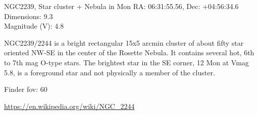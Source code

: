 \begin{block}{NGC2239, Star cluster + Nebula in Mon}
    RA: 06:31:55.56, Dec: +04:56:34.6 \\ 
    Dimensions: 9.3 \\ 
    Magnitude (V): 4.8

    NGC2239/2244 is a bright rectangular 15x5 arcmin cluster of about fifty
    star oriented NW-SE in the center of the Rosette Nebula. It contains
    several hot, 6th to 7th mag O-type stars. The brightest star in the SE
    corner, 12 Mon at Vmag 5.8, is a foreground star and not physically a
    member of the cluster.

    Finder fov: 60 

    \url{https://en.wikipedia.org/wiki/NGC_2244} 
\end{block}
